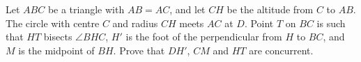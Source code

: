 Let $ABC$ be a triangle with $AB=AC$, and let $CH$ be the altitude from $C$ to $AB$. The circle with centre $C$ and radius $CH$ meets $AC$ at $D$. Point $T$ on $BC$ is such that $HT$ bisects $\angle BHC$, $H'$ is the foot of the perpendicular from $H$ to $BC$, and $M$ is the midpoint of $BH$. Prove that $DH'$, $CM$ and $HT$ are concurrent.

